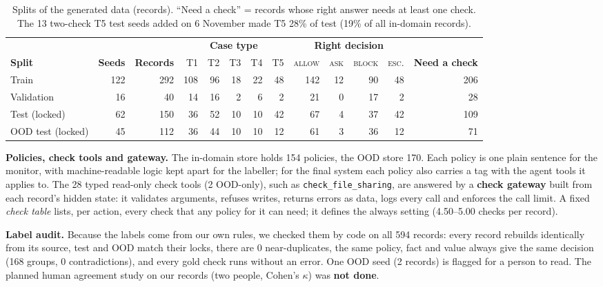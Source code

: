\documentclass[10pt]{article}
\begin{document}
\begin{table}[h]
\centering\footnotesize
\setlength{\tabcolsep}{2.6pt}
\begin{tabular}{@{}lrrrrrrrrrrrr@{}}
\toprule
 & & & \multicolumn{5}{c}{\textbf{Case type}} & \multicolumn{4}{c}{\textbf{Right decision}} & \\
\cmidrule(lr){4-8}\cmidrule(lr){9-12}
\textbf{Split} & \textbf{Seeds} & \textbf{Records} & T1 & T2 & T3 & T4 & T5 & \textsc{allow} & \textsc{ask} & \textsc{block} & \textsc{esc.} & \textbf{Need a check}\\
\midrule
Train & 122 & 292 & 108 & 96 & 18 & 22 & 48 & 142 & 12 & 90 & 48 & 206\\
Validation & 16 & 40 & 14 & 16 & 2 & 6 & 2 & 21 & 0 & 17 & 2 & 28\\
Test (locked) & 62 & 150 & 36 & 52 & 10 & 10 & 42 & 67 & 4 & 37 & 42 & 109\\
OOD test (locked) & 45 & 112 & 36 & 44 & 10 & 10 & 12 & 61 & 3 & 36 & 12 & 71\\
\bottomrule
\end{tabular}
\caption{Splits of the generated data (records). ``Need a check'' = records whose right answer needs at least
one check. The 13 two-check T5 test seeds added on 6 November made T5 28\% of test (19\% of all in-domain records).}
\label{tab:splits}
\end{table}

\textbf{Policies, check tools and gateway.} The in-domain store holds 154 policies, the OOD store 170. Each
policy is one plain sentence for the monitor, with machine-readable logic kept apart for the labeller; for
the final system each policy also carries a tag with the agent tools it applies to. The 28 typed read-only
check tools (2 OOD-only), such as \texttt{check\_file\_sharing}, are answered by a \textbf{check gateway}
built from each record's hidden state: it validates arguments, refuses writes, returns errors as data, logs
every call and enforces the call limit. A fixed \emph{check table} lists, per action, every check that any
policy for it can need; it defines the always setting (4.50--5.00 checks per record).

\textbf{Label audit.} Because the labels come from our own rules, we checked them by code on all 594 records:
every record rebuilds identically from its source, test and OOD match their locks, there are 0
near-duplicates, the same policy, fact and value always give the same decision (168 groups, 0
contradictions), and every gold check runs without an error. One OOD seed (2 records) is flagged for a
person to read. The planned human agreement study on our records (two people, Cohen's $\kappa$) was
\textbf{not done}.
\end{document}
